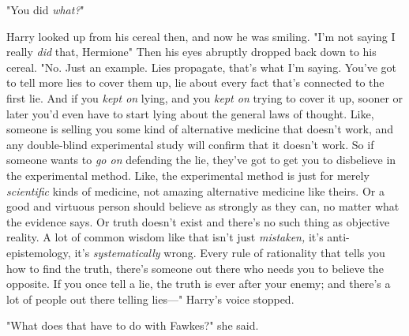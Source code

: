 "You did \emph{what?}"

Harry looked up from his cereal then, and now he was smiling. "I'm not saying I
really \emph{did} that, Hermione{\el}" Then his eyes abruptly dropped back
down to his cereal. "No. Just an example. Lies propagate, that's what I'm
saying. You've got to tell more lies to cover them up, lie about every fact
that's connected to the first lie. And if you \emph{kept on} lying, and you
\emph{kept on} trying to cover it up, sooner or later you'd even have to start
lying about the general laws of thought. Like, someone is selling you some kind
of alternative medicine that doesn't work, and any double-blind experimental
study will confirm that it doesn't work. So if someone wants to \emph{go on}
defending the lie, they've got to get you to disbelieve in the experimental
method. Like, the experimental method is just for merely \emph{scientific}
kinds of medicine, not amazing alternative medicine like theirs. Or a good and
virtuous person should believe as strongly as they can, no matter what the
evidence says. Or truth doesn't exist and there's no such thing as objective
reality. A lot of common wisdom like that isn't just \emph{mistaken,} it's
anti-epistemology, it's \emph{systematically} wrong. Every rule of rationality
that tells you how to find the truth, there's someone out there who needs you
to believe the opposite. If you once tell a lie, the truth is ever after your
enemy; and there's a lot of people out there telling lies\mbox{---}" Harry's voice
stopped.

"What does that have to do with Fawkes?" she said.

